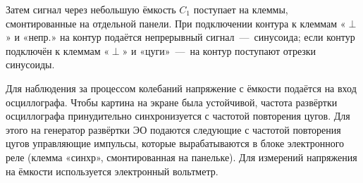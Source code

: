 Затем сигнал через небольшую ёмкость $C_1$ поступает на клеммы,
смонтированные на отдельной панели. При подключении контура к клеммам
«$\perp$» и «непр.» на контур подаётся непрерывный сигнал~---~синусоида; если
контур подключён к клеммам «$\perp$» и «цуги»~---~на контур поступают отрезки
синусоиды.

Для наблюдения за процессом колебаний напряжение с ёмкости подаётся на
вход осциллографа. Чтобы картина на экране была устойчивой, частота
развёртки осциллографа принудительно синхронизуется с частотой
повторения цугов. Для этого на генератор развёртки ЭО подаются следующие
с частотой повторения цугов управляющие импульсы, которые вырабатываются
в блоке электронного реле (клемма «синхр», смонтированная на панельке).
Для измерений напряжения на ёмкости используется электронный вольтметр.

